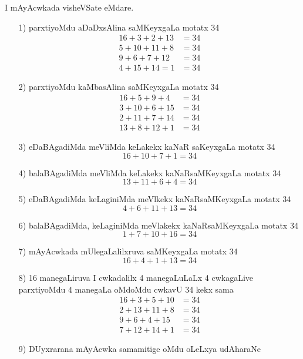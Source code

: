 I mAyAcwkada visheVSate eMdare.
\begin{enumerate}
\item[{\rm 1)}] parxtiyoMdu aDaDxsAlina saMKeyxgaLa motatx {\rm 34}
\begin{align*}
16+3+2+13 &=34\\
5+10+11+8 &=34\\
9+6+7+12 & =34\\
4+15+14=1 &=34
\end{align*}

\item[{\rm 2)}] parxtiyoMdu kaMbasAlina saMKeyxgaLa motatx {\rm 34}
\begin{align*}
16+5+9+4 &=34\\
3+10+6+15 &=34\\
2+11+7+14 & =34\\
13+8+12+1 &=34
\end{align*}

\item[{\rm 3)}] eDaBAgadiMda meVliMda keLakekx kaNaR saKeyxgaLa motatx {\rm 34}
$$
16+10+7+1=34
$$

\item[{\rm 4)}] balaBAgadiMda meVliMda keLakekx kaNaRsaMKeyxgaLa motatx {\rm 34}
$$
13+11+6+4 =34
$$

\item[{\rm 5)}] eDaBAgadiMda keLaginiMda meVlkekx kaNaRsaMKeyxgaLa motatx {\rm 34}
$$
4+6+11+13=34
$$

\item[{\rm 6)}] balaBAgadiMda, keLaginiMda meVlakekx kaNaRsaMKeyxgaLa motatx {\rm 34}
$$
1+7+10+16=34
$$

\item[{\rm 7)}] mAyAcwkada mUlegaLalilxruva saMKeyxgaLa motatx {\rm 34}
$$
16+4+1+13=34
$$ 

\item[{\rm 8)}] {\rm 16} manegaLiruva I cwkadalilx {\rm 4} manegaLuLaLx {\rm 4} cwkagaLive parxtiyoMdu {\rm 4} manegaLa oMdoMdu cwkavU {\rm 34} kekx sama
\begin{align*}
16+3+5+10 &=34\\
2+13+11+8 &=34\\
9+6+4+15 & =34\\
7+12+14+1 &=34
\end{align*}

\item[{\rm 9)}] DUyxrarana mAyAcwka samamitige oMdu oLeLxya udAharaNe

\begin{center}
\end{center}


\end{enumerate}
